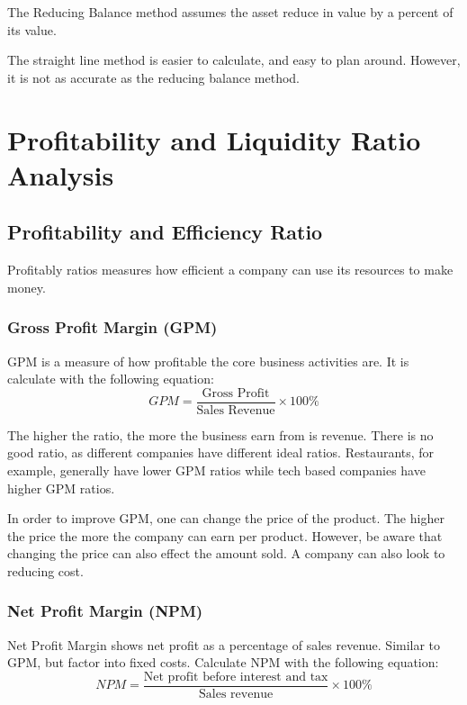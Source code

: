 \documentclass{standalone}
\begin{document}
The Reducing Balance method assumes the asset reduce in value by a percent of its value.

The straight line method is easier to calculate, and easy to plan around.
However, it is not as accurate as the reducing balance method.

\section{Profitability and Liquidity Ratio Analysis}

\subsection{Profitability and Efficiency Ratio}
Profitably ratios measures how efficient a company can use its resources to make money.

\subsubsection{Gross Profit Margin (GPM)}
GPM is a measure of how profitable the core business activities are.
It is calculate with the following equation:
\begin{equation}
    GPM = \frac{\textrm{Gross Profit}}{\textrm{Sales Revenue}} \times 100\%
\end{equation}

The higher the ratio, the more the business earn from is revenue.
There is no good ratio, as different companies have different ideal ratios.
Restaurants, for example, generally have lower GPM ratios while tech based companies have higher GPM ratios.

In order to improve GPM, one can change the price of the product.
The higher the price the more the company can earn per product.
However, be aware that changing the price can also effect the amount sold.
A company can also look to reducing cost.

\subsubsection{Net Profit Margin (NPM)}
Net Profit Margin shows net profit as a percentage of sales revenue.
Similar to GPM, but factor into fixed costs.
Calculate NPM with the following equation:
\begin{equation}
    NPM = \frac{\textrm{Net profit before interest and tax}}{\textrm{Sales revenue}} \times 100\%
\end{equation}
\end{document}

